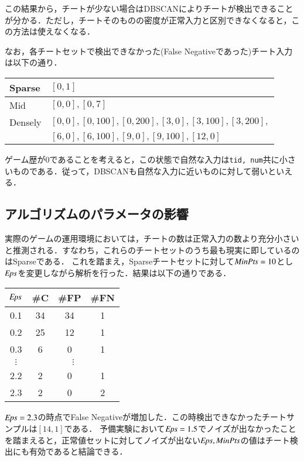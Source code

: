 この結果から，チートが少ない場合はDBSCANによりチートが検出できることが分かる．ただし，チートそのものの密度が正常入力と区別できなくなると，この方法は使えなくなる．

なお，各チートセットで検出できなかった(False Negativeであった)チート入力は以下の通り．

\begin{table}
\begin{center}
\begin{tabular}{l|l}
Sparse & $[0, 1]$ \\ \hline
Mid & $[0, 0], [0, 7]$ \\ \hline
Densely & $[0, 0], [0, 100], [0, 200], [3, 0], [3, 100], [3, 200],$ \\
& $[6, 0], [6, 100], [9, 0], [9, 100], [12, 0]$
\end{tabular}
\end{center}
\end{table}

ゲーム歴が0であることを考えると，この状態で自然な入力は{\tt tid, num}共に小さいものである．従って，DBSCANも自然な入力に近いものに対して弱いといえる．

\subsection{アルゴリズムのパラメータの影響}
実際のゲームの運用環境においては，チートの数は正常入力の数より充分小さいと推測される．すなわち，これらのチートセットのうち最も現実に即しているのはSparseである．
これを踏まえ，Sparseチートセットに対して${\it MinPts}=10$とし${\it Eps}$を変更しながら解析を行った．結果は以下の通りである．

\begin{table}[htbp]
\begin{center}
\begin{tabular}{c|ccc}
${\it Eps}$ & \#C & \#FP & \#FN \\ \hline
0.1 & 34 & 34 & 1 \\
0.2 & 25 & 12 & 1 \\
0.3 & 6 & 0 & 1 \\
$\vdots$ & \multicolumn{3}{c}{$\vdots$} \\
2.2 & 2 & 0 & 1 \\
2.3 & 2 & 0 & 2
\end{tabular}
\end{center}
\end{table}

${\it Eps}=2.3$の時点でFalse Negativeが増加した．この時検出できなかったチートサンプルは$[14, 1]$である．
予備実験において${\it Eps}=1.5$でノイズが出なかったことを踏まえると，正常値セットに対してノイズが出ない${\it Eps}, {\it MinPts}$の値はチート検出にも有効であると結論できる．

